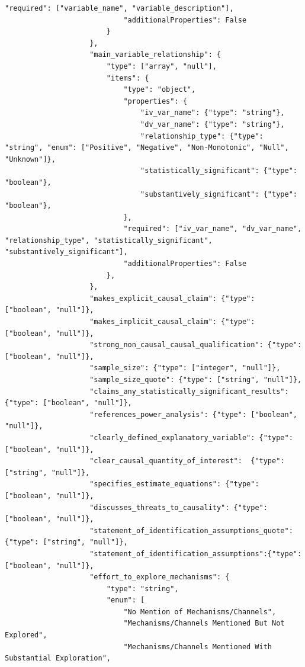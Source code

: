 \documentclass[12pt]{article}
\begin{document}
{\begin{Verbatim}[breaklines=true]
                            "required": ["variable_name", "variable_description"],
                            "additionalProperties": False
                        }
                    },
                    "main_variable_relationship": {
                        "type": ["array", "null"],
                        "items": {
                            "type": "object",
                            "properties": {
                                "iv_var_name": {"type": "string"},
                                "dv_var_name": {"type": "string"},
                                "relationship_type": {"type": "string", "enum": ["Positive", "Negative", "Non-Monotonic", "Null", "Unknown"]},
                                "statistically_significant": {"type": "boolean"},
                                "substantively_significant": {"type": "boolean"},
                            },
                            "required": ["iv_var_name", "dv_var_name", "relationship_type", "statistically_significant", "substantively_significant"],
                            "additionalProperties": False
                        },
                    },
                    "makes_explicit_causal_claim": {"type": ["boolean", "null"]},
                    "makes_implicit_causal_claim": {"type": ["boolean", "null"]},
                    "strong_non_causal_causal_qualification": {"type": ["boolean", "null"]},
                    "sample_size": {"type": ["integer", "null"]},
                    "sample_size_quote": {"type": ["string", "null"]},
                    "claims_any_statistically_significant_results": {"type": ["boolean", "null"]},
                    "references_power_analysis": {"type": ["boolean", "null"]},
                    "clearly_defined_explanatory_variable": {"type": ["boolean", "null"]},
                    "clear_causal_quantity_of_interest":  {"type": ["string", "null"]},
                    "specifies_estimate_equations": {"type": ["boolean", "null"]},
                    "discusses_threats_to_causality": {"type": ["boolean", "null"]},
                    "statement_of_identification_assumptions_quote": {"type": ["string", "null"]},
                    "statement_of_identification_assumptions":{"type": ["boolean", "null"]},
                    "effort_to_explore_mechanisms": {
                        "type": "string", 
                        "enum": [
                            "No Mention of Mechanisms/Channels",
                            "Mechanisms/Channels Mentioned But Not Explored", 
                            "Mechanisms/Channels Mentioned With Substantial Exploration",

\end{Verbatim}}
\end{document}
